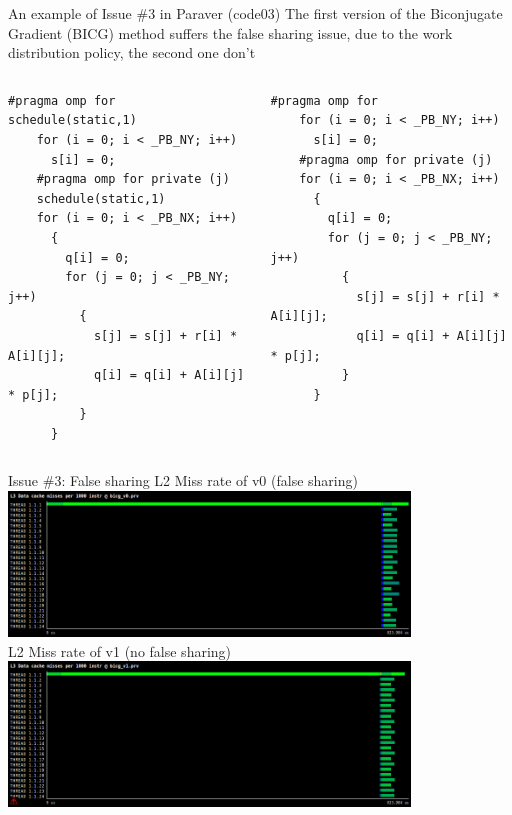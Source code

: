 \documentclass[10pt,xcolor=table]{beamer}
\begin{document}
\begin{frame}[fragile]{An example of Issue \#3 in Paraver (code03)}
The first version of the Biconjugate Gradient (BICG) method suffers the false sharing issue, due to the work distribution policy, the second one don't
\begin{columns}
\begin{column}{0.5\textwidth}
\begin{lstlisting}[style=shell,basicstyle=\scriptsize\ttfamily,gobble=3,caption={With False Sharing (v0)}]
    #pragma omp for schedule(static,1)
    for (i = 0; i < _PB_NY; i++)
      s[i] = 0;
    #pragma omp for private (j) 
    schedule(static,1)
    for (i = 0; i < _PB_NX; i++)
      {
        q[i] = 0;
        for (j = 0; j < _PB_NY; j++)
          {
            s[j] = s[j] + r[i] * A[i][j];
            q[i] = q[i] + A[i][j] * p[j];
          }
      }

  \end{lstlisting}
  \end{column}
\begin{column}{0.5\textwidth}
  \begin{lstlisting}[style=shell,gobble=3,basicstyle=\scriptsize\ttfamily,caption={Without False Sharing (v1)}]
    #pragma omp for
    for (i = 0; i < _PB_NY; i++)
      s[i] = 0;
    #pragma omp for private (j)
    for (i = 0; i < _PB_NX; i++)
      {
        q[i] = 0;
        for (j = 0; j < _PB_NY; j++)
          {
            s[j] = s[j] + r[i] * A[i][j];
            q[i] = q[i] + A[i][j] * p[j];
          }
      }

  \end{lstlisting}
  \end{column}
  \end{columns}
\end{frame}

\begin{frame}{Issue \#3: False sharing}
\centering
L2 Miss rate of v0 (false sharing)\\
\includegraphics[width=0.8\textwidth]{figs/L3_Data_cache_misses_per_1000_instr@bicg_v0.png}\\
L2 Miss rate of v1 (no false sharing)\\
\includegraphics[width=0.8\textwidth]{figs/L3_Data_cache_misses_per_1000_instr@bicg_v1.png}\\
\end{frame}
\end{document}
